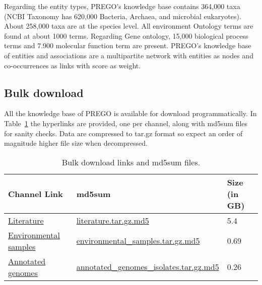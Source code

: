 Regarding the entity types, PREGO's knowledge base contains 364,000 taxa
(NCBI Taxonomy has 620,000 Bacteria, Archaea, and microbial eukaryotes). 
About 258,000 taxa are at the species level. 
All environment Ontology terms are found at about 1000 terms. Regarding Gene ontology, 15,000 biological process terms and 7.900 molecular function term are present.
PREGO's knowledge base of entities and associations are a multipartite network
with entities as nodes and co-occurrences as links with score as weight.


\subsection{Bulk download}
\label{bulk-download}

All the knowledge base of PREGO is available for download programmatically.
In Table~\ref{table:prego-appD-1} the hyperlinks are provided, one per channel, along with md5sum files for sanity checks.
Data are compressed to tar.gz format so expect an order of magnitude higher file size when decompressed.

   \begin{table}[ht]
      

      \begin{tabular}{lll}
      \toprule
      Channel Link & md5sum & Size (in GB) \\ \midrule

      \href{https://prego.hcmr.gr/download/literature.tar.gz}{Literature} & \href{https://prego.hcmr.gr/download/literature.tar.gz.md5}{literature.tar.gz.md5} & 5.4 \\

      \href{https://prego.hcmr.gr/download/environmental\_samples.tar.gz}{Environmental samples} & 
      \href{https://prego.hcmr.gr/download/environmental\_samples.tar.gz.md5}{environmental\_samples.tar.gz.md5}
      & 0.69 \\

      \href{https://prego.hcmr.gr/download/annotated\_genomes\_isolates.tar.gz}{Annotated genomes} &
      \href{https://prego.hcmr.gr/download/annotated\_genomes\_isolates.tar.gz.md5}{annotated\_genomes\_isolates.tar.gz.md5} & 0.26 \\ \bottomrule
      \end{tabular}
      \caption[PREGO Bulk download.]{Bulk download links and md5sum files.}
      \label{table:prego-appD-1}
   \end{table}



